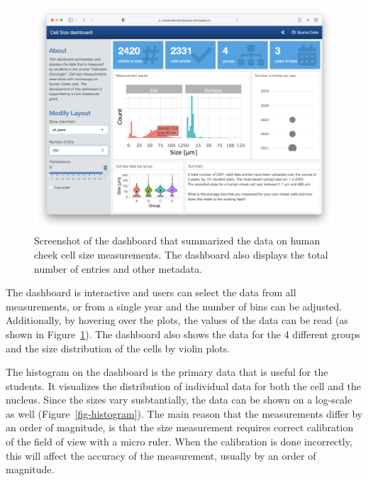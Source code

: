 \documentclass[
]{agujournal2019}
\begin{document}
\begin{figure}

{\centering \includegraphics{images/Dashboard_230828.png}

}

\caption{\label{fig-dashboard}Screenshot of the dashboard that
summarized the data on human cheek cell size measurements. The dashboard
also displays the total number of entries and other metadata.}

\end{figure}

The dashboard is interactive and users can select the data from all
measurements, or from a single year and the number of bins can be
adjusted. Additionally, by hovering over the plots, the values of the
data can be read (as shown in Figure~\ref{fig-dashboard}). The dashboard
also shows the data for the 4 different groups and the size distribution
of the cells by violin plots.

The histogram on the dashboard is the primary data that is useful for
the students. It visualizes the distribution of individual data for both
the cell and the nucleus. Since the sizes vary susbtantially, the data
can be shown on a log-scale as well (Figure~\ref{fig-histogram}). The
main reason that the measurements differ by an order of magnitude, is
that the size measurement requires correct calibration of the field of
view with a micro ruler. When the calibration is done incorrectly, this
will affect the accuracy of the measurement, usually by an order of
magnitude.
\end{document}
